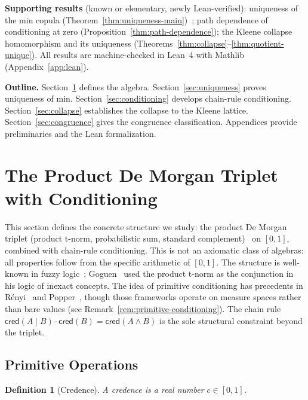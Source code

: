 \documentclass[11pt,a4paper]{article}
\newtheorem{definition}[theorem]{Definition}
\newcommand{\cred}{\mathsf{cred}}
\begin{document}
\textbf{Supporting results} (known or elementary, newly Lean-verified):
uniqueness of the min copula
(Theorem~\ref{thm:uniqueness-main})~\cite{nelsen2006};
path dependence of conditioning at zero
(Proposition~\ref{thm:path-dependence});
the Kleene collapse homomorphism and its uniqueness
(Theorems~\ref{thm:collapse}--\ref{thm:quotient-unique}).
All results are machine-checked in Lean~4 with Mathlib
(Appendix~\ref{app:lean}).

\textbf{Outline.}
Section~\ref{sec:algebra} defines the algebra.
Section~\ref{sec:uniqueness} proves uniqueness of min.
Section~\ref{sec:conditioning} develops chain-rule conditioning.
Section~\ref{sec:collapse} establishes the collapse to the Kleene lattice.
Section~\ref{sec:congruence} gives the congruence classification.
Appendices provide preliminaries and the Lean formalization.

\section{The Product De Morgan Triplet with Conditioning}
\label{sec:algebra}

This section defines the concrete structure we study: the product
De Morgan triplet (product t-norm, probabilistic sum, standard
complement)~\cite{klement2000,esteva2000} on $[0,1]$, combined with
chain-rule conditioning.
This is not an axiomatic class of algebras: all properties follow
from the specific arithmetic of $[0,1]$.
The structure is well-known in fuzzy
logic~\cite{hajek1998,klement2000,esteva2001};
Goguen~\cite{goguen1969} used the product t-norm as the conjunction
in his logic of inexact concepts.
The idea of primitive conditioning has precedents in
R\'enyi~\cite{renyi1955} and Popper~\cite{popper1959}, though those
frameworks operate on measure spaces rather than bare values
(see Remark~\ref{rem:primitive-conditioning}).
The chain rule $\cred(A \mid B) \cdot \cred(B) = \cred(A \land B)$
is the sole structural constraint beyond the triplet.

\subsection{Primitive Operations}

\begin{definition}[Credence]
\label{def:credence}
A \emph{credence} is a real number $c \in [0, 1]$.
\end{definition}
\end{document}
